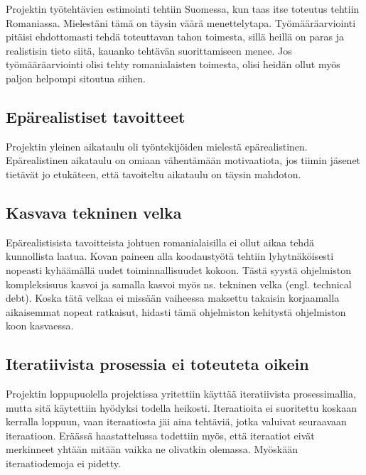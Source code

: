 \documentclass[a4paper]{article}
\begin{document}
Projektin työtehtävien estimointi tehtiin Suomessa, kun taas itse toteutus tehtiin Romaniassa. Mielestäni tämä on täysin väärä menettelytapa. Työmääräarviointi pitäisi ehdottomasti tehdä toteuttavan tahon toimesta, sillä heillä on paras ja realistisin tieto siitä, kauanko tehtävän suorittamiseen menee. Jos työmääräarviointi olisi tehty romanialaisten toimesta, olisi heidän ollut myös paljon helpompi sitoutua siihen.

\subsection{Epärealistiset tavoitteet}

Projektin yleinen aikataulu oli työntekijöiden mielestä epärealistinen. Epärealistinen aikataulu on omiaan vähentämään motivaatiota, jos tiimin jäsenet tietävät jo etukäteen, että tavoiteltu aikataulu on täysin mahdoton.

\subsection{Kasvava tekninen velka}

Epärealistisista tavoitteista johtuen romanialaisilla ei ollut aikaa tehdä kunnollista laatua. Kovan paineen alla koodaustyötä tehtiin lyhytnäköisesti nopeasti kyhäämällä uudet toiminnallisuudet kokoon. Tästä syystä ohjelmiston kompleksisuus kasvoi ja samalla kasvoi myös ns. tekninen velka (engl. technical debt). Koska tätä velkaa ei missään vaiheessa maksettu takaisin korjaamalla aikaisemmat nopeat ratkaisut, hidasti tämä ohjelmiston kehitystä ohjelmiston koon kasvaessa.

\subsection{Iteratiivista prosessia ei toteuteta oikein}

Projektin loppupuolella projektissa yritettiin käyttää iteratiivista prosessimallia, mutta sitä käytettiin hyödyksi todella heikosti. Iteraatioita ei suoritettu koskaan kerralla loppuun, vaan iteraatiosta jäi aina tehtäviä, jotka valuivat seuraavaan iteraatioon. Eräässä haastattelussa todettiin myös, että iteraatiot eivät merkinneet yhtään mitään vaikka ne olivatkin olemassa. Myöskään iteraatiodemoja ei pidetty.
\end{document}
